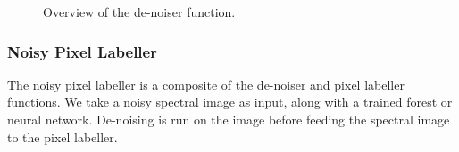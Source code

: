 \documentclass[12pt,twoside,notitlepage]{report}
\begin{document}
\begin{figure}[H]
{\begin{tikzpicture}[node distance=2cm,>=stealth',bend angle=45,auto]
                                    
                            \end{tikzpicture}
                        }

                    \caption{Overview of the de-noiser function.}
                \end{figure} 




            \subsubsection{Noisy Pixel Labeller}
                The noisy pixel labeller is a composite of the de-noiser and pixel labeller functions. We take a noisy 
                spectral image as input, along with a trained forest or neural network. De-noising is run on the image 
                before feeding the spectral image to the pixel labeller.
\end{document}
